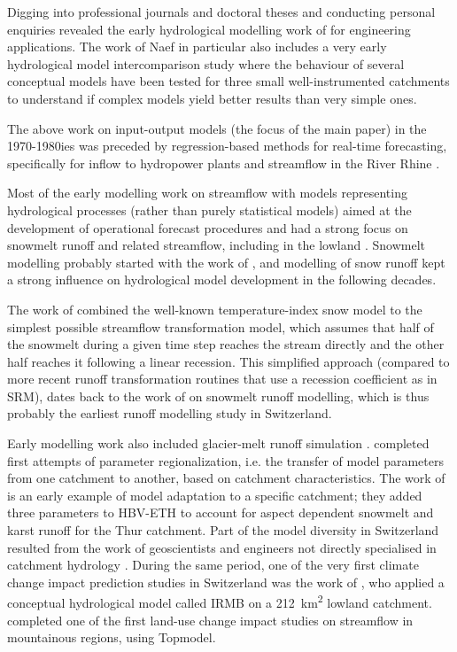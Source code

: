 \documentclass{article}
\begin{document}
Digging into professional journals and doctoral theses and conducting personal enquiries revealed the early hydrological modelling work of \citet{naef1974} for engineering applications. The work of Naef in particular also includes a very early hydrological model intercomparison study \citep{naef1977} where the behaviour of several conceptual models have been tested for three small well-instrumented catchments to understand if complex models yield better results than very simple ones.

The above work on input-output models (the focus of the main paper) in the 1970-1980ies was preceded by regression-based methods for real-time forecasting, specifically for inflow to hydropower plants \citep{jensenlang1973} and streamflow in the River Rhine \citep[e.g. to predict downstream summer droughts,][]{lugiez1969}.

Most of the early modelling work on streamflow with models representing hydrological processes (rather than purely statistical models) aimed at the development of operational forecast procedures and had a strong focus on snowmelt runoff and related streamflow, including in the lowland \citep{braun1986}. Snowmelt modelling probably started with the work of \citet{hoeck1952}, and modelling of snow runoff kept a strong influence on hydrological model development in the following decades.

The work of \citet{braun1986} combined the well-known temperature-index snow model \citep[underlying also the SRM model;][]{martinec1975} to the simplest possible streamflow transformation model, which assumes that half of the snowmelt during a given time step reaches the stream directly and the other half reaches it following a linear recession. This simplified approach (compared to more recent runoff transformation routines that use a recession coefficient as in SRM), dates back to the work of \citet{martinec1970} on snowmelt runoff modelling, which is thus probably the earliest runoff modelling study in Switzerland. 

Early modelling work also included glacier-melt runoff simulation \citep[][who used a model called HBV3-ETH, not in use anymore]{braun90}. \citet{braun1992} completed first attempts of parameter regionalization, i.e. the transfer of model parameters from one catchment to another, based on catchment characteristics. The work of \citet{hottelet1993} is an early example of model adaptation to a specific catchment; they added three parameters to HBV-ETH to account for aspect dependent snowmelt and karst runoff for the Thur catchment. Part of the model diversity in Switzerland resulted from the work of geoscientists and engineers not directly specialised in catchment hydrology \citep{Abednego1990, baumgartner1986, hager1984, Sautier1980}.
During the same period, one of the very first climate change impact prediction studies in Switzerland was the work of \citet{bultot1992}, who applied a conceptual hydrological model called IRMB on a 212~km\textsuperscript{2} lowland catchment. \citet{jordan1990} completed one of the first land-use change impact studies on streamflow in mountainous regions, using Topmodel. 
\end{document}
